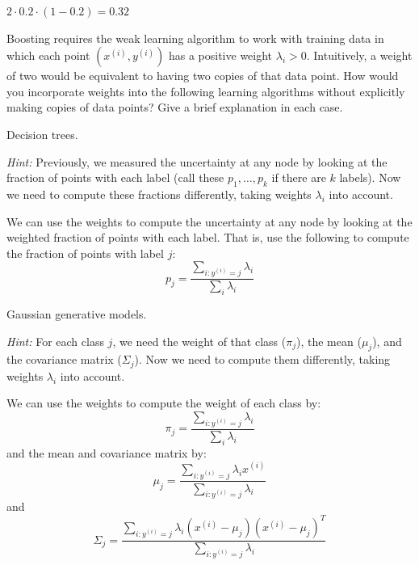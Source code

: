 \documentclass{article}
\begin{document}
\begin{probset}
\begin{prob}
    \begin{soln}
        $2 \cdot 0.2 \cdot (1 - 0.2) = 0.32$
    \end{soln}
\end{prob}

\newpage

\begin{prob}
    Boosting requires the weak learning algorithm to work with training data in which each point $(x^{(i)}, y^{(i)})$ has a positive weight $\lambda_i > 0$. Intuitively, a weight of two would be equivalent to having two copies of that data point. How would you incorporate weights into the following learning algorithms without explicitly making copies of data points? Give a brief explanation in each case.

    \begin{subprobset}
    \begin{subprob}
        Decision trees.

        \textit{Hint:} Previously, we measured the uncertainty at any node by looking at the fraction of points with each label (call these $p_1, \ldots, p_k$ if there are $k$ labels). Now we need to compute these fractions differently, taking weights $\lambda_i$ into account.

        \begin{soln}
            We can use the weights to compute the uncertainty at any node by looking at the weighted fraction of points with each label. That is, use the following to compute the fraction of points with label $j$:
            \[
                p_j = \frac{\sum_{i: y^{(i)} = j} \lambda_i}{\sum_{i} \lambda_i}
            \]
        \end{soln}
    \end{subprob}

    \begin{subprob}
        Gaussian generative models.

        \textit{Hint:} For each class $j$, we need the weight of that class ($\pi_j$), the mean ($\mu_j$), and the covariance matrix ($\Sigma_j$). Now we need to compute them differently, taking weights $\lambda_i$ into account.

        \begin{soln}
            We can use the weights to compute the weight of each class by:
            \[
                \pi_j = \frac{\sum_{i: y^{(i)} = j} \lambda_i}{\sum_{i} \lambda_i}
            \]
            and the mean and covariance matrix by:
            \[
                \mu_j = \frac{\sum_{i: y^{(i)} = j} \lambda_i x^{(i)}}{\sum_{i: y^{(i)} = j} \lambda_i}
            \]
            and
            \[
                \Sigma_j = \frac{\sum_{i: y^{(i)} = j} \lambda_i (x^{(i)} - \mu_j)(x^{(i)} - \mu_j)^T}{\sum_{i: y^{(i)} = j} \lambda_i}
            \]
        \end{soln}
    \end{subprob}


\end{subprobset}
\end{prob}
\end{probset}
\end{document}
